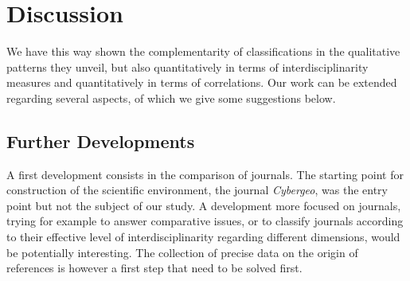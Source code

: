 %








\section*{Discussion}
\label{sec:discussion}

We have this way shown the complementarity of classifications in the qualitative patterns they unveil, but also quantitatively in terms of interdisciplinarity measures and quantitatively in terms of correlations. Our work can be extended regarding several aspects, of which we give some suggestions below.


\subsection*{Further Developments}


A first development consists in the comparison of journals. The starting point for construction of the scientific environment, the journal \textit{Cybergeo}, was the entry point but not the subject of our study. A development more focused on journals, trying for example to answer comparative issues, or to classify journals according to their effective level of interdisciplinarity regarding different dimensions, would be potentially interesting. The collection of precise data on the origin of references is however a first step that need to be solved first.


